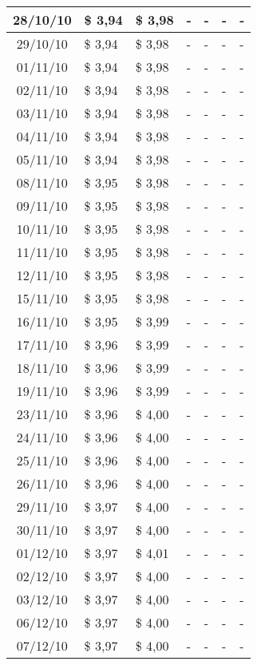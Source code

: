 \begin{center}
\begin{longtable}{|c|p{1.5cm}|p{1.5cm}|p{1.5cm}|p{1.5cm}|p{1.5cm}|p{1.5cm}|}
28/10/10 & \$ 3,94 & \$ 3,98 & - & - & - & - \\ \hline
29/10/10 & \$ 3,94 & \$ 3,98 & - & - & - & - \\ \hline
01/11/10 & \$ 3,94 & \$ 3,98 & - & - & - & - \\ \hline
02/11/10 & \$ 3,94 & \$ 3,98 & - & - & - & - \\ \hline
03/11/10 & \$ 3,94 & \$ 3,98 & - & - & - & - \\ \hline
04/11/10 & \$ 3,94 & \$ 3,98 & - & - & - & - \\ \hline
05/11/10 & \$ 3,94 & \$ 3,98 & - & - & - & - \\ \hline
08/11/10 & \$ 3,95 & \$ 3,98 & - & - & - & - \\ \hline
09/11/10 & \$ 3,95 & \$ 3,98 & - & - & - & - \\ \hline
10/11/10 & \$ 3,95 & \$ 3,98 & - & - & - & - \\ \hline
11/11/10 & \$ 3,95 & \$ 3,98 & - & - & - & - \\ \hline
12/11/10 & \$ 3,95 & \$ 3,98 & - & - & - & - \\ \hline
15/11/10 & \$ 3,95 & \$ 3,98 & - & - & - & - \\ \hline
16/11/10 & \$ 3,95 & \$ 3,99 & - & - & - & - \\ \hline
17/11/10 & \$ 3,96 & \$ 3,99 & - & - & - & - \\ \hline
18/11/10 & \$ 3,96 & \$ 3,99 & - & - & - & - \\ \hline
19/11/10 & \$ 3,96 & \$ 3,99 & - & - & - & - \\ \hline
23/11/10 & \$ 3,96 & \$ 4,00 & - & - & - & - \\ \hline
24/11/10 & \$ 3,96 & \$ 4,00 & - & - & - & - \\ \hline
25/11/10 & \$ 3,96 & \$ 4,00 & - & - & - & - \\ \hline
26/11/10 & \$ 3,96 & \$ 4,00 & - & - & - & - \\ \hline
29/11/10 & \$ 3,97 & \$ 4,00 & - & - & - & - \\ \hline
30/11/10 & \$ 3,97 & \$ 4,00 & - & - & - & - \\ \hline
01/12/10 & \$ 3,97 & \$ 4,01 & - & - & - & - \\ \hline
02/12/10 & \$ 3,97 & \$ 4,00 & - & - & - & - \\ \hline
03/12/10 & \$ 3,97 & \$ 4,00 & - & - & - & - \\ \hline
06/12/10 & \$ 3,97 & \$ 4,00 & - & - & - & - \\ \hline
07/12/10 & \$ 3,97 & \$ 4,00 & - & - & - & - \\ \hline

\end{longtable}
\end{center}
